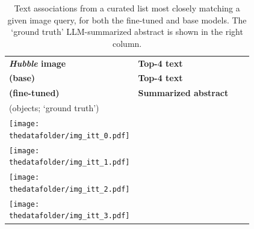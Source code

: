 \documentclass[10pt]{article} %
\newcommand{\hubble}{\emph{Hubble}\xspace}
\begin{document}
\begin{table}[h!]
  \centering
  \renewcommand{\arraystretch}{0.1}
  \begin{tabular}{m{3cm} m{3.2cm} m{3.2cm} m{5cm}}
      \toprule
      \centering \bfseries \hubble image & \centering \textbf{Top-4 text} \\ \textbf{\textcolor{deeppurple}{(base)}} & \centering  \textbf{Top-4 text} \\ \textbf{\textcolor{deepred}{(fine-tuned)}} & \centering \textbf{Summarized abstract} \\ (objects; `ground truth') \tabularnewline
      \midrule
      \centering \texttt{[image: \\thedatafolder/img\_itt\_0.pdf]} & \centering \scriptsize  & \centering  \scriptsize  &  {\scriptsize } \tabularnewline
      \midrule
      \centering \texttt{[image: \\thedatafolder/img\_itt\_1.pdf]} & \centering \scriptsize  & \centering  \scriptsize  &  {\scriptsize } \tabularnewline
      \midrule
      \centering \texttt{[image: \\thedatafolder/img\_itt\_2.pdf]} & \centering \scriptsize  & \centering  \scriptsize  &  {\scriptsize } \tabularnewline
      \midrule
      \centering \texttt{[image: \\thedatafolder/img\_itt\_3.pdf]} & \centering \scriptsize  & \centering  \scriptsize  &  {\scriptsize } \tabularnewline
      \bottomrule
  \end{tabular}
  \caption{Text associations from a curated list most closely matching a given image query, for both the \textcolor{deepred}{fine-tuned} and \textcolor{deeppurple}{base} models. The `ground truth' LLM-summarized abstract is shown in the right column.}
  \label{tab:itt}
\end{table}
\end{document}
